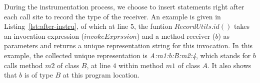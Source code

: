\documentclass{fac}
\newcommand{\keyword}[1]{\mathsf{#1}}
\begin{document}
During the instrumentation process, we choose to insert statements right after each call site to record the type of the receiver.
An example is given in Listing~\ref{lst:after-instru}, of which at line $5$, the funtion $RecordUtils.id()$ takes an invocation expression ($invokeExprssion$) and a method receiver ($b$) as parameters and returns a unique representation string for this invocation. In this example, the collected unique representation is \emph{A:m1:b:B:m2:4}, which stands for $b$ calls method $m2$ of class $B$, at line $4$ within method $m1$ of class $A$. It also shows that $b$ is of type $B$ at this program location. 
%
%
\end{document}
